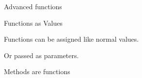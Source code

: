 \begin{frame}{Advanced functions}

\end{frame}

\begin{frame}[fragile]{Functions as Values}

Functions can be assigned like normal values.

\begin{Shaded}
\begin{Highlighting}[]
 
     


\NormalTok{)  }
\end{Highlighting}
\end{Shaded}

\end{frame}

\begin{frame}[fragile]

Or passed as parameters.

\begin{Shaded}
\begin{Highlighting}[]
 
     

\NormalTok{, } \NormalTok{: }\NormalTok{(}\NormalTok{))}
\end{Highlighting}
\end{Shaded}

\end{frame}

\begin{frame}[fragile]{Methods are functions}

\begin{Shaded}
\begin{Highlighting}[]
 \NormalTok{):}
     
         



\NormalTok{)  }
\end{Highlighting}
\end{Shaded}

\end{frame}

